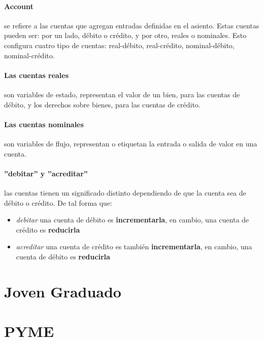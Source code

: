 \documentclass[12pt, a4paper]{article}
\begin{document}
\paragraph{Account} se refiere a las cuentas que agregan entradas definidas en  el asiento. Estas cuentas pueden ser: por un lado, débito o crédito, y por otro, reales o nominales. Esto configura cuatro tipo de cuentas: real-débito, real-crédito, nominal-débito, nominal-crédito.
\paragraph{Las cuentas reales} son variables de estado, representan el valor de un bien, para las cuentas de débito, y los derechos sobre bienes, para las cuentas de crédito. 
\paragraph{Las cuentas nominales} son variables de flujo, representan o etiquetan la entrada o salida de valor en una cuenta.
\paragraph{''debitar'' y ''acreditar''} las cuentas tienen un significado distinto dependiendo de que la cuenta sea de débito o crédito. De tal forma que:
\begin{itemize}
\item \emph{debitar} una cuenta de débito es \textbf{incrementarla}, en cambio, una cuenta de crédito es \textbf{reducirla}
\item \emph{acreditar} una cuenta de crédito es también \textbf{incrementarla}, en cambio, una cuenta de débito es \textbf{reducirla}
\end{itemize}

\section{Joven Graduado}


\clearpage

\section{PYME}

\end{document}
